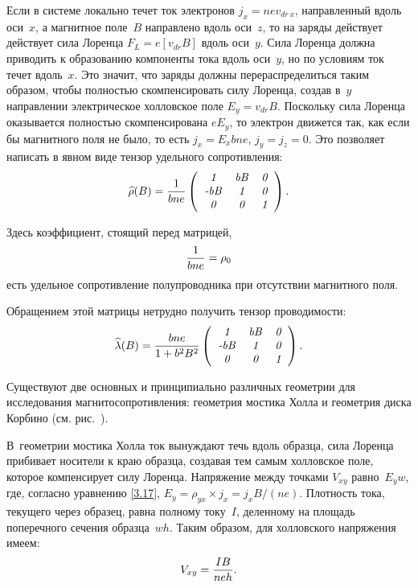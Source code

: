 Если в системе локально течет ток электронов $j_x=nev_{dr\, x}$, направленный
вдоль оси~$x$, а магнитное поле~$B$ направлено вдоль оси~$z$, то на заряды
действует действует сила Лоренца $ F_{L}=e[v_{dr}B]$ вдоль оси~$y$.
Сила Лоренца должна приводить к образованию компоненты тока вдоль оси~$y$, но по
условиям ток течет вдоль~$x$. Это значит, что заряды должны перераспределиться
таким образом, чтобы полностью скомпенсировать силу
Лоренца, создав в~$y$ направлении электрическое холловское поле $E_y=v_{dr}B$.
Поскольку сила Лоренца
оказывается полностью скомпенсирована $eE_y$, то электрон движется так, как если
бы магнитного поля не
было, то есть $j_x=E_xbne$, $j_y=j_z=0$. Это позволяет написать в явном виде
тензор удельного сопротивления:
\begin{equation}
	\widehat{\rho}(B)=\frac{1}{bne}\left(
	\begin{tabular}{ccc}
		{\it 1} & {\it bB} & {\it 0} \\
		{\it -bB} &{\it 1}& {\it 0} \\
		{\it 0} &{\it 0}& {\it 1}\\
	\end{tabular}
	\right).
	\eqmark{3.17}
\end{equation}

Здесь коэффициент, стоящий перед матрицей,
\begin{equation}
	\frac{1}{bne} = \rho_0
	\eqmark{UdSoprot}
\end{equation}
есть удельное сопротивление полупроводника при отсутствии магнитного поля.

Обращением этой матрицы нетрудно получить тензор проводимости:
\begin{equation}
	\widehat{\lambda}(B)=\frac{bne}{1+b^2B^2}\left(
	\begin{tabular}{ccc}
		{\it 1} & {\it bB} & {\it 0} \\
		{\it -bB} &{\it 1}& {\it 0} \\
		{\it 0} &{\it 0}& {\it 1}\\
	\end{tabular}
	\right).
	\eqmark{3.18}
\end{equation}

Существуют две основных и принципиально различных геометрии для исследования
магнитосопротивления: геометрия
мостика Холла и геометрия диска Корбино (см. рис.~).

В~геометрии мостика Холла ток вынуждают течь вдоль образца, сила Лоренца
прибивает носители к краю образца, создавая тем самым холловское поле, которое
компенсирует силу Лоренца. Напряжение между точками $V_{xy}$ равно~$E_yw$, где,
согласно уравнению \eqref{3.17}, $E_y=\rho_{yx}\times j_x=j_x B/(ne)$. Плотность
тока, текущего через образец, равна полному току~$I$, деленному на площадь
поперечного сечения образца~$wh$. Таким образом, для холловского напряжения
имеем:
\begin{equation}
	V_{xy}=\frac{IB}{neh}.
	\eqmark{3.19}
\end{equation}

